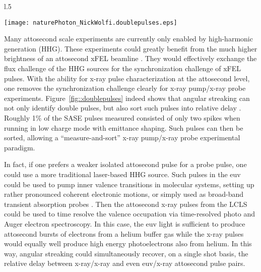 \begin{wrapfigure}[9]{l}{.5\linewidth}
\vspace{-1\baselineskip}
\centerline{\texttt{[image: naturePhoton\_NickWolfi.doublepulses.eps]}}
\vspace{-1\baselineskip}
\caption{\label{fig::doublepulses}Reproduced from Ref.~\cite{Nick2018}.
}
\end{wrapfigure}
Many attosecond scale experiments are currently only enabled by high-harmonic generation (HHG)\cite{Lewenstein1994,Hentschel2001,Chen2014,Biegert2014,Schmidt2016,Biegert2016,WornerSci2017,Zenghu2017}.
These experiments could greatly benefit from the much higher brightness of an attosecond xFEL beamline \cite{Ding2009,Xiang2009,xLEAP}.
They would effectively exchange the flux challenge of the HHG sources for the synchronization challenge of xFEL pulses.
With the ability for x-ray pulse characterization at the attosecond level, one removes the synchronization challenge clearly for x-ray pump/x-ray probe experiments.
Figure~\ref{fig::doublepulses} indeed shows that angular streaking can not only identify double pulses, but also sort such pulses into relative delay \cite{Nick2018}.
Roughly 1\% of the SASE pulses measured consisted of only two spikes when running in low charge mode with emittance shaping.
Such pulses can then be sorted, allowing a ``measure-and-sort'' x-ray pump/x-ray probe experimental paradigm.

In fact, if one prefers a weaker isolated attosecond pulse for a probe pulse, one could use a more traditional laser-based HHG source.
Such pulses in the euv could be used to pump inner valence transitions in molecular systems, setting up rather pronounced coherent electronic motions, or simply used as broad-band transient absorption probes \cite{Biegert2016}.
Then the attosecond x-ray pulses from the LCLS could be used to time resolve the valence occupation via time-resolved photo and Auger electron spectroscopy.
In this case, the euv light is sufficient to produce attosecond bursts of electrons from a helium buffer gas while the x-ray pulses would equally well produce high energy photoelectrons also from helium.
In this way, angular streaking could simultaneously recover, on a single shot basis, the relative delay between x-ray/x-ray and even euv/x-ray attosecond pulse pairs.

